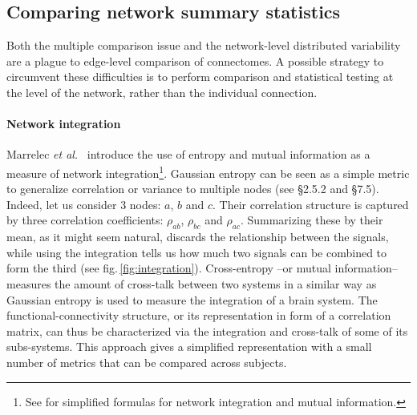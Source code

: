 \documentclass[5p]{elsarticle}
\begin{document}

\subsection{Comparing network summary statistics}

Both the multiple comparison issue and the network-level distributed
variability are a plague to edge-level comparison of connectomes. A
possible strategy to circumvent these difficulties is to perform
comparison and statistical testing at the level of the network, rather
than the individual connection. 

\paragraph{Network integration}
%
Marrelec \emph{et al.}\
\cite{marrelec2008} introduce the use of entropy and mutual information
as a measure of network integration\footnote{See \cite{varoquaux2010c}
for simplified formulas for network integration and mutual information.}.
Gaussian entropy can be seen as a simple metric to generalize correlation
or variance to multiple nodes (see \cite{anderson1958} \S2.5.2 and
\S7.5). Indeed, let us consider 3 nodes: $a$, $b$ and $c$. Their
correlation structure is captured by three correlation coefficients:
$\rho_{ab}$, $\rho_{bc}$ and $\rho_{ac}$. Summarizing these by their
mean, as it might seem natural, discards the relationship between the
signals, while using the integration tells us how much two signals can be
combined to form the third (see fig.\,\ref{fig:integration}). 
Cross-entropy --or mutual information--
\cite{marrelec2008} measures the amount of cross-talk between two
systems in a similar way as Gaussian entropy is used to measure the
integration of a brain
system. The functional-connectivity structure, or its representation in
form of a correlation matrix, can thus be characterized via the
integration and cross-talk of some of its subs-systems. This approach
gives a simplified representation with a small number of metrics that can
be compared across subjects.
\end{document}
